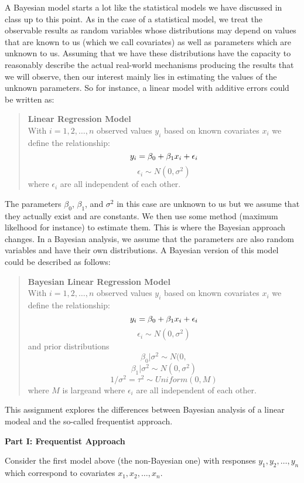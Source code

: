 \documentclass[11pt]{article}\usepackage[]{graphicx}\usepackage[]{color}
\begin{document}
A Bayesian model starts a lot like the statistical models we have discussed in class up to this point. As in the case of a statistical model, we treat the observable results as random variables whose distributions may depend on values that are known to us (which we call covariates) as well as parameters which are unknown to us. Assuming that we have these distributions have the capacity to reasonably describe the actual real-world mechanisms producing the results that we will observe, then our interest mainly lies in estimating the values of the unknown parameters. So for instance, a linear model with additive errors could be written as:
\begin{quote}
\textbf{Linear Regression Model}\\
With $i = 1, 2, \ldots, n$ observed values $y_i$ based on known covariates $x_i$ we define the relationship:
\[
   y_{i} = \beta_0 + \beta_1 x_i + \epsilon_i \\
\]
\[
   \epsilon_i \sim N(0, \sigma^2)
\]
where $\epsilon_i$ are all independent of each other.
\end{quote}
The parameters $\beta_0$, $\beta_1$, and $\sigma^2$ in this case are unknown to us but we assume that they actually exist and are constants. We then use some method (maximum likelhood for instance) to estimate them. This is where the Bayesian approach changes. In a Bayesian analysis, we assume that the parameters are also random variables and have their own distributions. A Bayesian version of this model could be described as follows:
\begin{quote}
\textbf{Bayesian Linear Regression Model}\\
With $i = 1, 2, \ldots, n$ observed values $y_i$ based on known covariates $x_i$ we define the relationship:
\[
   y_{i} = \beta_0 + \beta_1 x_i + \epsilon_i \\
\]
\[
   \epsilon_i \sim N(0, \sigma^2)
\]
and prior distributions
\[
   \beta_0 | \sigma^2 \sim N(0, 
\]
\[
   \beta_1 | \sigma^2 \sim N(0, \sigma^2)
\]
\[
   1/\sigma^2 = \tau^2 \sim Uniform(0, M)
\]
where $M$ is largeand where $\epsilon_i$ are all independent of each other.
\end{quote}

This assignment explores the differences between Bayesian analysis of a linear modeal and the so-called frequentist approach.

\textbf{Part I: Frequentist Approach}

Consider the first model above (the non-Bayesian one) with responses $y_1, y_2, \ldots, y_n$ which correspond to covariates $x_1, x_2, \ldots, x_n$.
\end{document}
